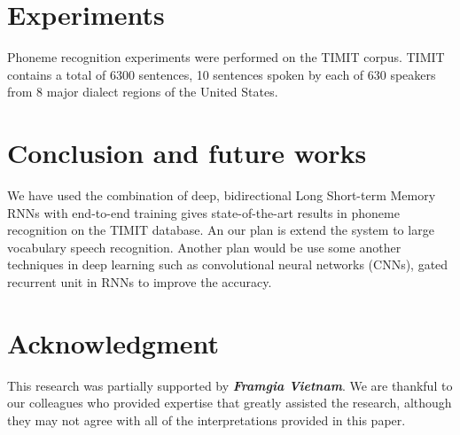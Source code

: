 \documentclass[conference]{IEEEtran}
\begin{document}
\section{Experiments}
Phoneme recognition experiments were performed on the TIMIT corpus. TIMIT contains a total of 6300 sentences, 10 sentences spoken by each of 630 speakers from 8 major dialect regions of the United States.



\section{Conclusion and future works}
We have used the combination of deep, bidirectional Long Short-term Memory RNNs with end-to-end training gives state-of-the-art results in phoneme recognition on the TIMIT database. An our plan is extend the system to large vocabulary speech recognition. Another plan would be use some another techniques in deep learning such as convolutional neural networks (CNNs), gated recurrent unit in RNNs to improve the accuracy.


\section*{Acknowledgment}


This research was partially supported by \textbf{\textit{Framgia Vietnam}}. We are thankful to our colleagues who provided  expertise that greatly assisted the research, although they may not agree with all of the interpretations provided in this paper.


\ifCLASSOPTIONcaptionsoff
  \newpage
\fi




\end{document}
